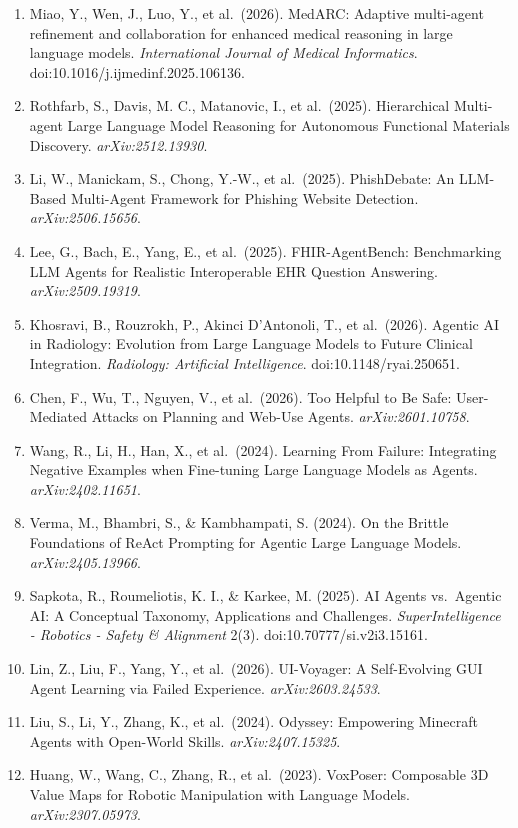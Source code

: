 \begin{enumerate}
\item
  Miao, Y., Wen, J., Luo, Y., et al.~(2026). MedARC: Adaptive multi-agent refinement and collaboration for enhanced medical reasoning in large language models. \emph{International Journal of Medical Informatics}. doi:10.1016/j.ijmedinf.2025.106136.
\item
  Rothfarb, S., Davis, M. C., Matanovic, I., et al.~(2025). Hierarchical Multi-agent Large Language Model Reasoning for Autonomous Functional Materials Discovery. \emph{arXiv:2512.13930}.
\item
  Li, W., Manickam, S., Chong, Y.-W., et al.~(2025). PhishDebate: An LLM-Based Multi-Agent Framework for Phishing Website Detection. \emph{arXiv:2506.15656}.
\item
  Lee, G., Bach, E., Yang, E., et al.~(2025). FHIR-AgentBench: Benchmarking LLM Agents for Realistic Interoperable EHR Question Answering. \emph{arXiv:2509.19319}.
\item
  Khosravi, B., Rouzrokh, P., Akinci D'Antonoli, T., et al.~(2026). Agentic AI in Radiology: Evolution from Large Language Models to Future Clinical Integration. \emph{Radiology: Artificial Intelligence}. doi:10.1148/ryai.250651.
\item
  Chen, F., Wu, T., Nguyen, V., et al.~(2026). Too Helpful to Be Safe: User-Mediated Attacks on Planning and Web-Use Agents. \emph{arXiv:2601.10758}.
\item
  Wang, R., Li, H., Han, X., et al.~(2024). Learning From Failure: Integrating Negative Examples when Fine-tuning Large Language Models as Agents. \emph{arXiv:2402.11651}.
\item
  Verma, M., Bhambri, S., \& Kambhampati, S. (2024). On the Brittle Foundations of ReAct Prompting for Agentic Large Language Models. \emph{arXiv:2405.13966}.
\item
  Sapkota, R., Roumeliotis, K. I., \& Karkee, M. (2025). AI Agents vs.~Agentic AI: A Conceptual Taxonomy, Applications and Challenges. \emph{SuperIntelligence - Robotics - Safety \& Alignment} 2(3). doi:10.70777/si.v2i3.15161.
\item
  Lin, Z., Liu, F., Yang, Y., et al.~(2026). UI-Voyager: A Self-Evolving GUI Agent Learning via Failed Experience. \emph{arXiv:2603.24533}.
\item
  Liu, S., Li, Y., Zhang, K., et al.~(2024). Odyssey: Empowering Minecraft Agents with Open-World Skills. \emph{arXiv:2407.15325}.
\item
  Huang, W., Wang, C., Zhang, R., et al.~(2023). VoxPoser: Composable 3D Value Maps for Robotic Manipulation with Language Models. \emph{arXiv:2307.05973}.

\end{enumerate}
